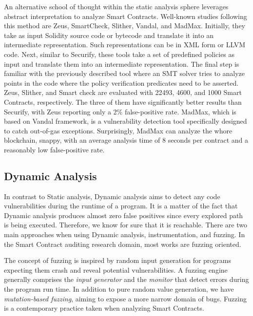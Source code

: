 \documentclass[a4paper,11pt]{article}
\begin{document}
An alternative school of thought within the static analysis sphere leverages
abstract interpretation to analyze Smart Contracts. Well-known studies following
this method are Zeus\cite{kalra2018zeus}, SmartCheck, Slither, Vandal, and MadMax. Initially, they
take as input Solidity source code or bytecode and translate it into an
intermediate representation. Such representations can be in XML form \cite{tikhomirov2018smartcheck} or LLVM\cite{kalra2018zeus} code. Next, similar to Securify, these tools take a set of
predefined policies as input and translate them into an intermediate
representation. The final step is familiar with the previously described tool
where an SMT solver tries to analyze points in the code where the policy
verification predicates need to be asserted. Zeus, Slither, and Smart check are
evaluated with 22493, 4600, and 1000 Smart Contracts, respectively. The three of
them have significantly better results than Securify, with Zeus reporting only a
2\% false-positive rate. MadMax, which is based on Vandal framework, is a
vulnerability detection tool specifically designed to catch out-of-gas
exceptions. Surprisingly, MadMax can analyze the whore blockchain, snappy, with
an average analysis time of 8 seconds per contract and a reasonably low
false-positive rate.

\subsection{Dynamic Analysis}
In contrast to Static analysis, Dynamic analysis aims to detect any code
vulnerabilities during the runtime of a program. It is a matter of the fact that
Dynamic analysis produces almost zero false positives since every explored path
is being executed. Therefore, we know for sure that it is reachable. There are
two main approaches when using Dynamic analysis, instrumentation, and fuzzing.
In the Smart Contract auditing research domain, most works are fuzzing oriented.

The concept of fuzzing is inspired by random input generation for programs
expecting them crash and reveal potential vulnerabilities. A fuzzing engine
generally comprises the \emph{input generator} and the \emph{monitor} that
detect errors during the program run time. In addition to pure random value
generation, we have \emph{mutation-based fuzzing}, aiming to expose a more
narrow domain of bugs. Fuzzing is a contemporary practice taken when analyzing
Smart Contracts. 
\end{document}
